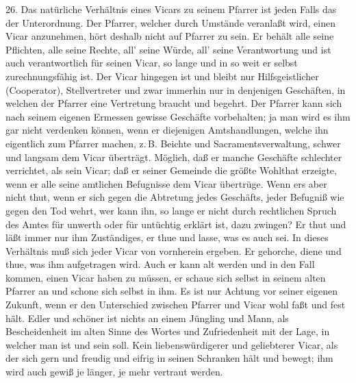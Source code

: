 26. Das natürliche Verhältnis eines Vicars zu seinem Pfarrer ist jeden Falls das der Unterordnung. Der Pfarrer, welcher durch Umstände veranlaßt wird, einen Vicar anzunehmen, hört deshalb nicht auf Pfarrer zu sein. Er behält alle seine Pflichten, alle seine Rechte, all’ seine
Würde, all’ seine Verantwortung und ist auch verantwortlich für seinen Vicar, so lange und in so weit er selbst zurechnungsfähig ist. Der Vicar hingegen ist und bleibt nur Hilfsgeistlicher (Cooperator), Stellvertreter und zwar immerhin nur in denjenigen Geschäften, in welchen der Pfarrer eine Vertretung braucht und begehrt. Der Pfarrer kann sich nach seinem eigenen Ermessen gewisse Geschäfte vorbehalten; ja man wird es ihm gar nicht verdenken können, wenn er diejenigen Amtshandlungen, welche ihn eigentlich zum Pfarrer machen, z.\,B. Beichte und Sacramentsverwaltung, schwer und langsam dem Vicar überträgt. Möglich, daß er manche Geschäfte schlechter verrichtet, als sein Vicar; daß er seiner Gemeinde die größte Wohlthat erzeigte, wenn er alle seine amtlichen Befugnisse dem Vicar übertrüge. Wenn ers aber nicht thut, wenn er sich gegen die Abtretung jedes Geschäfts, jeder Befugniß wie gegen den Tod wehrt, wer kann ihn, so lange er nicht durch rechtlichen Spruch des Amtes für unwerth oder für untüchtig erklärt ist, dazu zwingen? Er thut und läßt immer nur ihm Zuständiges, er thue und lasse, was es auch sei. In dieses Verhältnis muß sich jeder Vicar von vornherein ergeben. Er gehorche, diene und thue, was ihm aufgetragen wird. Auch er kann alt werden und in den Fall kommen, einen Vicar haben zu müssen, er schaue sich selbst in seinem alten Pfarrer an und schone sich selbst in ihm. Es ist nur Achtung vor seiner eigenen Zukunft, wenn er den Unterschied zwischen Pfarrer und Vicar wohl faßt und fest hält. Edler und schöner ist nichts an einem Jüngling und Mann, als Bescheidenheit im alten Sinne des Wortes
und Zufriedenheit mit der Lage, in welcher man ist und sein soll. Kein liebenswürdigerer und geliebterer Vicar, als der sich gern und freudig und eifrig in seinen Schranken hält und bewegt; ihm wird auch gewiß je länger, je mehr vertraut werden.

